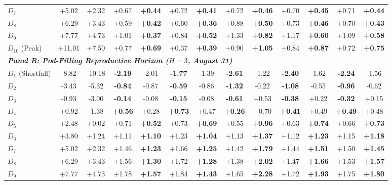 \begin{table}[htbp]
\begin{tabular*}{\textwidth}{@{\extracolsep{\fill}} l cc cc cc cc cc cc @{}}
$D_{7}$ & +5.02 & +2.32 & +0.67 & \textbf{+0.44} & +0.72 & \textbf{+0.41} & +0.72 & \textbf{+0.46} & +0.70 & \textbf{+0.45} & +0.71 & \textbf{+0.44} \\
$D_{8}$ & +6.29 & +3.43 & +0.59 & \textbf{+0.42} & +0.60 & \textbf{+0.36} & +0.88 & \textbf{+0.50} & +0.73 & \textbf{+0.46} & +0.70 & \textbf{+0.43} \\
$D_{9}$ & +7.77 & +4.73 & +1.01 & \textbf{+0.37} & +0.84 & \textbf{+0.52} & +1.33 & \textbf{+0.82} & +1.17 & \textbf{+0.60} & +1.09 & \textbf{+0.58} \\
$D_{10}$ (Peak) & +11.01 & +7.50 & +0.77 & \textbf{+0.69} & +0.37 & \textbf{+0.39} & +0.90 & \textbf{+1.05} & +0.84 & \textbf{+0.87} & +0.72 & \textbf{+0.75} \\
\midrule
\multicolumn{13}{l}{\textit{\textbf{Panel B: Pod-Filling Reproductive Horizon ($H = 3$, August 31)}}} \\
\midrule
$D_{1}$ (Shortfall) & -8.82 & -10.18 & \textbf{-2.19} & -2.01 & \textbf{-1.77} & -1.39 & \textbf{-2.61} & -1.22 & \textbf{-2.40} & -1.62 & \textbf{-2.24} & -1.56 \\
$D_{2}$ & -3.43 & -5.32 & \textbf{-0.84} & -0.87 & \textbf{-0.59} & -0.86 & \textbf{-1.32} & -0.22 & \textbf{-1.08} & -0.55 & \textbf{-0.96} & -0.62 \\
$D_{3}$ & -0.93 & -3.00 & \textbf{-0.14} & -0.08 & \textbf{-0.15} & -0.08 & \textbf{-0.61} & +0.53 & \textbf{-0.38} & +0.22 & \textbf{-0.32} & +0.15 \\
$D_{4}$ & +0.92 & -1.38 & \textbf{+0.56} & +0.28 & \textbf{+0.73} & +0.47 & \textbf{+0.26} & +0.70 & \textbf{+0.41} & +0.49 & \textbf{+0.49} & +0.48 \\
$D_{5}$ & +2.48 & +0.02 & +0.71 & \textbf{+0.52} & +0.73 & \textbf{+0.69} & +0.55 & \textbf{+0.96} & +0.63 & \textbf{+0.74} & +0.66 & \textbf{+0.73} \\
$D_{6}$ & +3.80 & +1.24 & +1.11 & \textbf{+1.10} & +1.23 & \textbf{+1.04} & +1.13 & \textbf{+1.37} & +1.12 & \textbf{+1.23} & +1.15 & \textbf{+1.18} \\
$D_{7}$ & +5.02 & +2.32 & +1.46 & \textbf{+1.23} & +1.66 & \textbf{+1.25} & +1.42 & \textbf{+1.79} & +1.44 & \textbf{+1.51} & +1.50 & \textbf{+1.45} \\
$D_{8}$ & +6.29 & +3.43 & +1.56 & \textbf{+1.30} & +1.72 & \textbf{+1.28} & +1.38 & \textbf{+2.02} & +1.47 & \textbf{+1.66} & +1.53 & \textbf{+1.57} \\
$D_{9}$ & +7.77 & +4.73 & +1.78 & \textbf{+1.57} & +1.84 & \textbf{+1.43} & +1.65 & \textbf{+2.28} & +1.72 & \textbf{+1.93} & +1.75 & \textbf{+1.80} \\

\end{tabular*}
\end{table}
